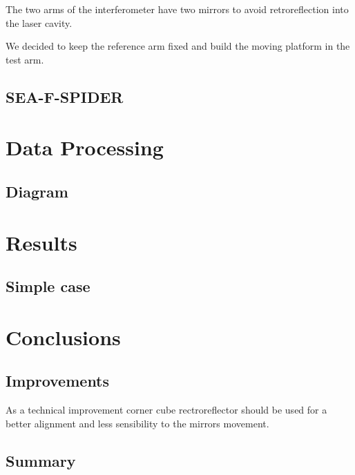 \documentclass[12pt,a4paper,twoside]{article}
\begin{document}
The two arms of the interferometer have two mirrors to avoid retroreflection into the laser cavity.

We decided to keep the reference arm fixed and build the moving platform in the test arm.

\subsection{SEA-F-SPIDER}
\section{Data Processing}
\subsection{Diagram}
\section{Results}
\subsection{Simple case}
\section{Conclusions}
\subsection{Improvements}
As a technical improvement corner cube rectroreflector should be used for a better alignment and less sensibility to the mirrors movement.
\subsection{Summary}
\end{document}
